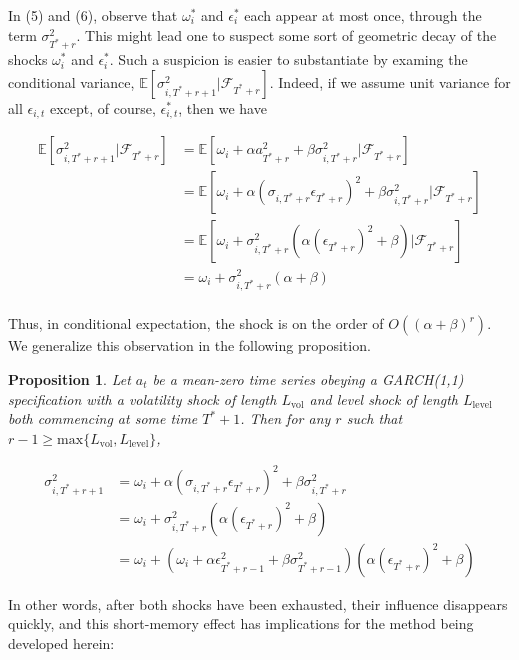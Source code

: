 \documentclass[11pt]{article}
\newtheorem{prop}{Proposition}
\theoremstyle{definition}
\begin{document}
In (5) and (6), observe that $\omega_{i}^{*}$ and $\epsilon^{*}_{i}$ each appear at most once, through the term $\sigma^{2}_{T^{*}+r}$.  This might lead one to suspect some sort of geometric decay of the shocks $\omega_{i}^{*}$ and $\epsilon^{*}_{i}$.  Such a suspicion is easier to substantiate by examing the conditional variance, $\mathbb{E}[ \sigma^{2}_{i,T^{*}+r+1} |\mathcal{F}_{T^{*}+r}]$.  Indeed, if we assume unit variance for all $\epsilon_{i,t}$ except, of course, $\epsilon^{*}_{i,t}$, then we have 

\begin{align*}
\mathbb{E}[ \sigma^{2}_{i,T^{*}+r+1} |\mathcal{F}_{T^{*}+r}] & = \mathbb{E}[\omega_{i} + \alpha a_{T^{*}+r}^{2} + \beta\sigma^{2}_{i,T^{*}+r} |\mathcal{F}_{T^{*}+r}] \\
& = \mathbb{E}[\omega_{i} + \alpha(\sigma_{i,T^{*}+r}\epsilon_{T^{*}+r})^{2} + \beta\sigma^{2}_{i,T^{*}+r}|\mathcal{F}_{T^{*}+r}] \\
& = \mathbb{E}[\omega_{i} + \sigma^{2}_{i,T^{*}+r}(\alpha (\epsilon_{T^{*}+r})^{2} + \beta)|\mathcal{F}_{T^{*}+r}] \\
& = \omega_{i} + \sigma^{2}_{i,T^{*}+r}(\alpha + \beta) \\
\end{align*}

Thus, in conditional expectation, the shock is on the order of $O((\alpha+\beta)^{r})$.  We generalize this observation in the following proposition.

\begin{prop}
Let $a_{t}$ be a mean-zero time series obeying a GARCH(1,1) specification with a volatility shock of length $L_{\text{vol}}$ and level shock of length $L_{\text{level}}$ both commencing at some time $T^{*}+1$.  Then for any $r$ such that $r-1 \geq \text{max}\{L_{\text{vol}},L_{\text{level}}\}$, 

\begin{align*}
\sigma^{2}_{i,T^{*}+r+1} & = \omega_{i} + \alpha(\sigma_{i,T^{*}+r}\epsilon_{T^{*}+r})^{2} + \beta\sigma^{2}_{i,T^{*}+r} \\
& = \omega_{i} + \sigma^{2}_{i,T^{*}+r}(\alpha (\epsilon_{T^{*}+r})^{2} + \beta)\\
& = \omega_{i} + (\omega_{i} + \alpha\epsilon_{T^{*}+r-1}^{2} +\beta\sigma^{2}_{T^{*}+r-1})(\alpha (\epsilon_{T^{*}+r})^{2} + \beta)
\end{align*}
\end{prop}

In other words, after both shocks have been exhausted, their influence disappears quickly, and this short-memory effect has implications for the method being developed herein:
\end{document}
